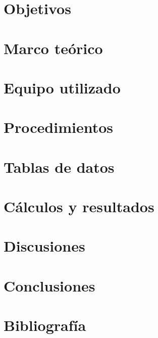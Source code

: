 \documentclass[12pt, a4paper]{article}
\begin{document}


\pagestyle{fancy}
\fancyfoot{} %
\fancyfoot[R]{\thepage}

\tableofcontents
\clearpage

\section{Objetivos}


\section{Marco teórico}


\section{Equipo utilizado}


\section{Procedimientos}


\section{Tablas de datos}


\section{Cálculos y resultados}


\section{Discusiones}


\section{Conclusiones}


\section{Bibliografía}
\printbibliography
\end{document}
